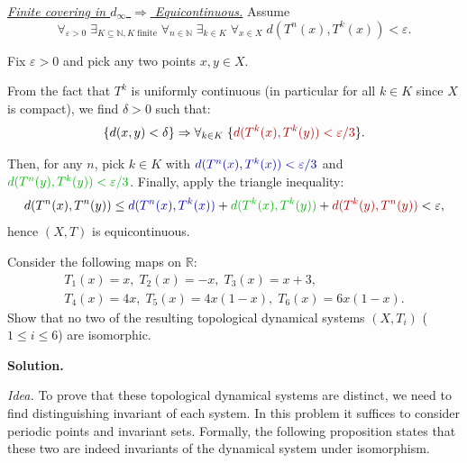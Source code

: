 \documentclass{template}
\begin{document}
\underline{\textit{Finite covering in $d_{\infty}$ $\Rightarrow$ Equicontinuous.}} Assume 
\begin{equation*}
    \forall_{\varepsilon>0} \; \exists_{K \subseteq \mathbb{N}, K \; \text{finite}} \; \forall_{n \in \mathbb{N}} \; \exists_{k \in K} \; \forall_{x \in X} \; d(T^n(x), T^k(x)) < \varepsilon.
\end{equation*}

Fix $\varepsilon>0$ and pick any two points $x,y \in X$.

From the fact that $T^k$ is uniformly continuous (in particular for all $k \in
K$ since $X$ is compact), we find $\delta>0$ such that:
\begin{equation*}
    \{d(x,y)<\delta\} \Rightarrow \forall_{k \in K} \; \{\textcolor{red!70!black}{d(T^k(x), T^k(y)) < \varepsilon/3}\}.
\end{equation*}

Then, for any $n$, pick $k \in K$ with $\textcolor{blue!70!black}{d(T^n(x), T^k(x))<\varepsilon/3}$ and 
$\textcolor{green!70!black}{d(T^n(y), T^k(y))<\varepsilon/3}$. Finally, apply the triangle inequality:
\begin{equation*}
    d(T^n(x), T^n(y)) \leq \textcolor{blue!70!black}{d(T^n(x), T^k(x))} + \textcolor{green!70!black}{d(T^k(x), T^k(y))} + \textcolor{red!70!black}{d(T^k(y), T^n(y))} < \varepsilon,
\end{equation*}
hence $(X,T)$ is equicontinuous.

\newpage

\begin{problem}[Exercise 3]
    Consider the following maps on $\mathbb{R}$:
    \begin{gather*}
        T_1(x) = x, \; T_2(x) = -x, \; T_3(x) = x+3, \\ 
        T_4(x) = 4x, \; T_5(x) = 4x(1-x), \; T_6(x) = 6x(1-x).
    \end{gather*}
    Show that no two of the resulting topological dynamical systems $(X,T_i)$ ($1 \leq i \leq 6$) are isomorphic.
\end{problem}

\textbf{Solution.}

\textit{Idea.} To prove that these topological dynamical systems are distinct,
we need to find distinguishing invariant of each system. In this problem 
it suffices to consider periodic points and invariant sets. Formally,
the following proposition states that these two are indeed invariants 
of the dynamical system under isomorphism.
\end{document}
